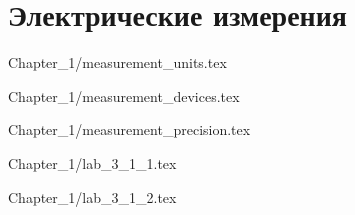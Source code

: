 \chapter{Электрические измерения}


 {Chapter_1/measurement_units.tex}

 {Chapter_1/measurement_devices.tex}

 {Chapter_1/measurement_precision.tex}

\newpage


 {Chapter_1/lab_3_1_1.tex}

 {Chapter_1/lab_3_1_2.tex}


